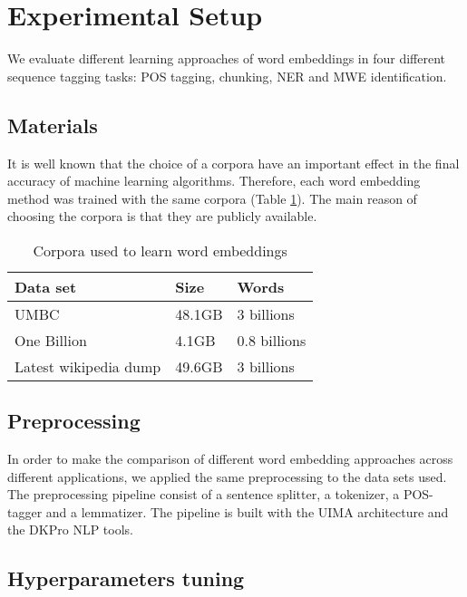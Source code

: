 


\section{Experimental Setup}
We evaluate different learning approaches of word embeddings in four different sequence tagging tasks: POS tagging, chunking, NER and MWE identification.

\subsection{Materials}
It is well known that the choice of a corpora have an important effect in the final accuracy of machine learning algorithms. 
Therefore, each word embedding method was trained with the same corpora (Table \ref{corpus}). The main reason of choosing the corpora 
is that they are publicly available. 

\begin{table}[h]
\begin{center}
\begin{small}
\begin{tabular}{lll}
\hline
\textbf{Data set} & \textbf{Size} & \textbf{Words} \\ \hline
UMBC 	& 48.1GB & 3 billions \\
One Billion 	& 4.1GB & 0.8 billions  \\
Latest wikipedia dump & 49.6GB & 3 billions \\
\end{tabular}
\end{small}
\caption{Corpora used to learn word embeddings}
\label{corpus}
\end{center}
\end{table}

\subsection{Preprocessing}

In order to make the comparison of different word embedding approaches across different applications, we applied the same preprocessing to the data sets used. 
The preprocessing pipeline consist of a sentence splitter, a tokenizer, a POS-tagger and a lemmatizer. The pipeline is built with the UIMA architecture and the DKPro NLP tools. 


\subsection{Hyperparameters tuning}

